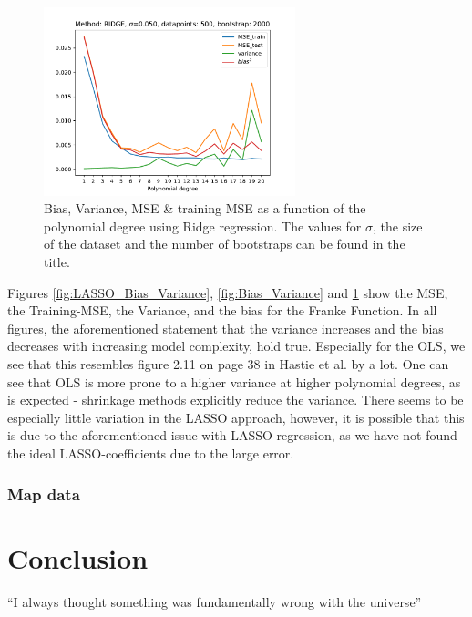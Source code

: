 \documentclass[11pt,a4paper,titlepage]{article}
\begin{document}
\begin{figure}[H]
\centering
\includegraphics[width=0.65\textwidth]{Bias_Variance_RIDGE.pdf}
\caption[Bias, Variance, MSE \& training MSE as a function of the polynomial degree using Ridge regression]{Bias, Variance, MSE \& training MSE as a function of the polynomial degree using Ridge regression. The values for $\sigma$, the size of the dataset and the number of bootstraps can be found in the title.}
\label{fig:Ridge_Bias_Variance}
\end{figure}
Figures \ref{fig:LASSO_Bias_Variance}, \ref{fig:Bias_Variance} and \ref{fig:Ridge_Bias_Variance} show the MSE, the Training-MSE, the Variance, and the bias for the Franke Function. In all figures, the aforementioned statement that the variance increases and the bias decreases with increasing model complexity, hold true. Especially for the OLS, we see that this resembles  figure 2.11 on page 38 in Hastie et al. by a lot\citep{hastie01statisticallearning}. One can see that OLS is more prone to a higher variance at higher polynomial degrees, as is expected - shrinkage methods explicitly reduce the variance. There seems to be especially little variation in the LASSO approach, however, it is possible that this is due to the aforementioned issue with LASSO regression, as we have not found the ideal LASSO-coefficients due to the large error.
\subsubsection{Map data}

\section{Conclusion}
``I always thought something was fundamentally wrong with the universe'' \citep{hastie01statisticallearning}



\end{document}
